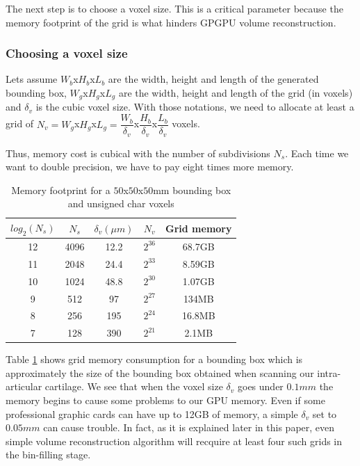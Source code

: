 \documentclass[12pt,journal,compsoc]{IEEEtran}
\begin{document}
The next step is to choose a voxel size. This is a critical parameter because the memory footprint of the grid is what hinders GPGPU volume reconstruction. 

\subsubsection{Choosing a voxel size}

Lets assume $W_b$x$H_b$x$L_b$ are the width, height and length of the generated bounding box, $W_g$x$H_g$x$L_g$ are the width, height and length of the grid (in voxels) and $\delta_v$ is the cubic voxel size. With those notations, we need to allocate at least a grid of $N_v = W_g$x$H_g$x$L_g =  \dfrac{W_b}{\delta_v}$x$\dfrac{H_b}{\delta_v}$x$\dfrac{L_b}{\delta_v}$ voxels. \par

\vspace{0.2cm}
Thus, memory cost is cubical with the number of subdivisions $N_s$. Each time we want to double precision, we have to pay eight times more memory.

\begin{table}[!t]
\renewcommand{\arraystretch}{1.3}
\caption{Memory footprint for a $50$x$50$x$50$mm bounding box and unsigned char voxels}
\label{memory_table}
\centering
\begin{tabular}{|c|c||c|c||c|}
\hline
$log_2(N_s)$ & $N_s$ & $\delta_v (\mu m)$ & $N_v$ & Grid memory \\
\hline
12 & 4096 & 12.2 & $2^{36}$ & 68.7GB\\\hline
11 & 2048 & 24.4 & $2^{33}$ & 8.59GB\\\hline
10 & 1024 & 48.8 & $2^{30}$ & 1.07GB\\\hline
9 & 512 & 97 & $2^{27}$ & 134MB\\\hline
8 & 256 & 195 & $2^{24}$ & 16.8MB\\\hline
7 & 128 & 390 & $2^{21}$ & 2.1MB\\\hline
\end{tabular}
\end{table}
Table \ref{memory_table} shows grid memory consumption for a bounding box which is approximately the size of the bounding box obtained when scanning our intra-articular cartilage.
We see that when the voxel size $\delta_v$ goes under $0.1mm$ the memory begins to cause some problems to our GPU memory.
Even if some professional graphic cards can have up to 12GB of memory, a simple $\delta_v$ set to $0.05mm$ can cause trouble.
In fact, as it is explained later in this paper, even simple volume reconstruction algorithm will recquire at least four such grids in the bin-filling stage.
\end{document}

